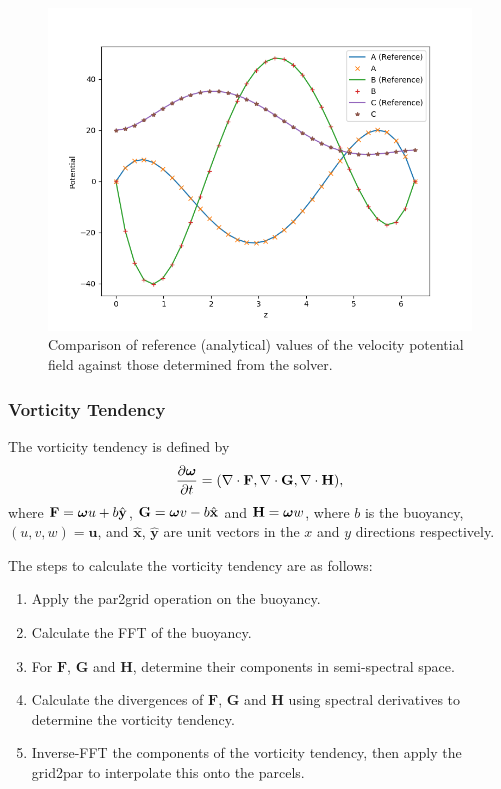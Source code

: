 \documentclass{article}
\renewcommand{\v}[1]{\ensuremath{\mathbf{#1}}} %
\newcommand{\gv}[1]{\ensuremath{\mbox{\boldmath$ #1 $}}}
\newcommand{\uv}[1]{\hat{\ensuremath{\mathbf{ #1 }}}} %
\newcommand{\pd}[2]{\frac{\partial #1}{\partial #2}}
\renewcommand{\div}[1]{\v{\nabla} \cdot #1} %
\begin{document}
\begin{figure}
  \begin{center}
    \includegraphics[scale=0.6]{pmpic_images/solution.png}
  \end{center}
  \caption{Comparison of reference (analytical) values of the velocity potential field against those determined from the solver.}
  \label{inversion_fig}
\end{figure}


\subsubsection{Vorticity Tendency}\label{tendency}
The vorticity tendency is defined by
\begin{equation}
  \pd{\gv{\omega}}{t} = ( \div{\v{F}},\div{\v{G}},\div{\v{H}}),
\end{equation}
where $\v{F} = \gv{\omega}u + b \uv{y} $, $\v{G}=\gv{\omega}v - b \uv{x}$ and $\v{H}=\gv{\omega}w$, where $b$ is the buoyancy, $(u,v,w) = \v{u}$, and $\uv{x}$, $\uv{y}$ are unit vectors in the $x$ and $y$ directions respectively.

The steps to calculate the vorticity tendency are as follows:
\begin{enumerate}
  \item Apply the par2grid operation on the buoyancy.
  \item Calculate the FFT of the buoyancy.
  \item For $\v{F}$, $\v{G}$ and $\v{H}$, determine their components in semi-spectral space.
  \item  Calculate the divergences of $\v{F}$, $\v{G}$ and $\v{H}$ using spectral derivatives to determine the vorticity tendency.
  \item Inverse-FFT the components of the vorticity tendency, then apply the grid2par to interpolate this onto the parcels.
\end{enumerate}
\end{document}
